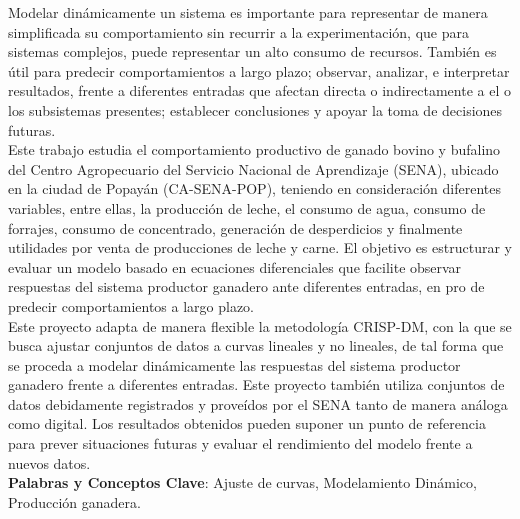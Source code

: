 Modelar dinámicamente un sistema es importante para representar de manera simplificada su comportamiento sin recurrir a la experimentación, que para sistemas complejos, puede representar un alto consumo de recursos. También es útil para predecir comportamientos a largo plazo; observar, analizar, e interpretar resultados, frente a diferentes entradas que afectan directa o indirectamente a el o los subsistemas presentes; establecer conclusiones y apoyar la toma de decisiones futuras.\\
% 

Este trabajo estudia el comportamiento productivo de ganado bovino y bufalino del Centro Agropecuario del Servicio Nacional de Aprendizaje (SENA), ubicado en la ciudad de Popayán (CA-SENA-POP), teniendo en consideración diferentes variables, entre ellas, la producción de leche, el consumo de agua, consumo de forrajes, consumo de concentrado, generación de desperdicios y finalmente utilidades por venta de producciones de leche y carne. El objetivo es estructurar y evaluar un modelo basado en ecuaciones diferenciales que facilite observar respuestas del sistema productor ganadero ante diferentes entradas, en pro de predecir comportamientos a largo plazo.\\

Este proyecto adapta de manera flexible la metodología CRISP-DM, con la que se busca ajustar conjuntos de datos a curvas lineales y no lineales, de tal forma que se proceda a modelar dinámicamente las respuestas del sistema productor ganadero frente a diferentes entradas. Este proyecto también utiliza conjuntos de datos debidamente registrados y proveídos por el SENA tanto de manera análoga como digital. Los resultados obtenidos pueden suponer un punto de referencia para prever situaciones futuras y evaluar el rendimiento del modelo frente a nuevos datos.\\

{\bf Palabras y Conceptos Clave}: Ajuste de curvas, Modelamiento Dinámico, Producción ganadera.